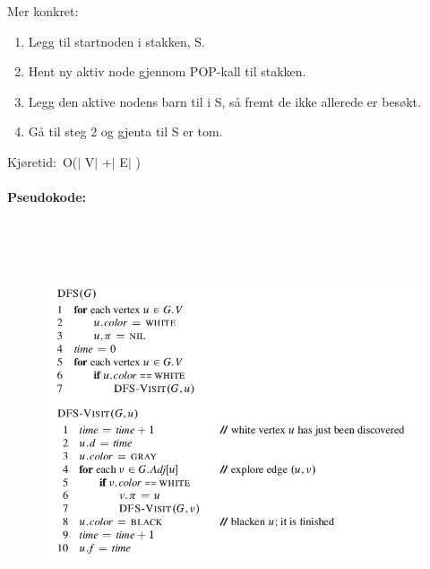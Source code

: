 \documentclass[12pt]{report}
\begin{document}
\vspace{\baselineskip}
Mer konkret:\par

\begin{enumerate}[label*=\arabic*.]
	\item Legg til startnoden i stakken, S.\par

	\item Hent ny aktiv node gjennom POP-kall til stakken.\par

	\item Legg den aktive nodens barn til i S, så fremt de ikke allerede er besøkt.\par

	\item Gå til steg 2 og gjenta til S er tom.
\end{enumerate}\par

Kjøretid: O($ \vert $ V$ \vert $ +$ \vert $ E$ \vert $ )\par


\vspace{\baselineskip}
\setlength{\parskip}{6.0pt}
\paragraph*{Pseudokode:}

\vspace{\baselineskip}



\begin{figure}[H]
	\begin{Center}
		\includegraphics[width=6.27in,height=4.61in]{./media/image100.png}
	\end{Center}
\end{figure}
\end{document}
